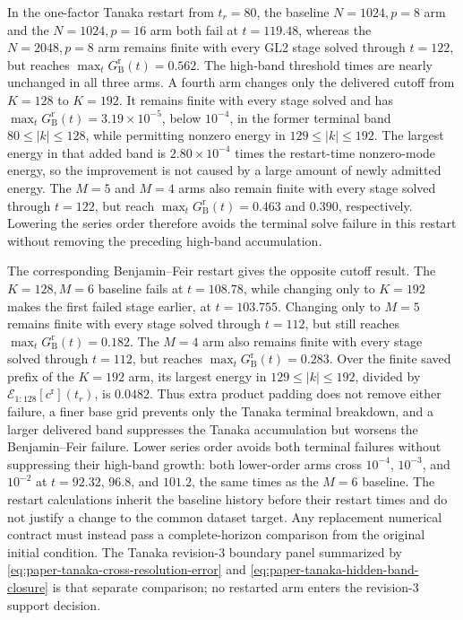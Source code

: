 In the one-factor Tanaka restart from \(t_r=80\), the
baseline \(N=1024,p=8\) arm and the \(N=1024,p=16\) arm both fail at
\(t=119.48\), whereas the \(N=2048,p=8\) arm remains finite with every GL2
stage solved through \(t=122\), but reaches
\(\max_t G_{\mathrm B}^{\mathrm r}(t)=0.562\).  The high-band threshold
times are nearly unchanged in all three arms.  A fourth arm changes only the
delivered cutoff
from \(K=128\) to \(K=192\).  It remains finite with every stage solved and
has \(\max_t G_{\mathrm B}^{\mathrm r}(t)=3.19\times10^{-5}\), below
\(10^{-4}\), in the former terminal band
\(80\leq |k|\leq128\), while permitting nonzero energy in
\(129\leq |k|\leq192\).  The largest energy in that added band is
\(2.80\times10^{-4}\) times the restart-time nonzero-mode energy, so the
improvement is not caused by a large amount of newly admitted energy.
The \(M=5\) and \(M=4\) arms also remain finite with every stage solved through
\(t=122\), but reach \(\max_t G_{\mathrm B}^{\mathrm r}(t)=0.463\) and
\(0.390\), respectively.
Lowering the series order therefore avoids the terminal solve failure in this
restart without removing the preceding high-band accumulation.

The corresponding Benjamin--Feir restart gives the opposite cutoff result.
The \(K=128,M=6\) baseline fails at \(t=108.78\), while changing only to
\(K=192\) makes the first failed stage earlier, at \(t=103.755\).  Changing
only to \(M=5\) remains finite with every stage solved through \(t=112\), but
still reaches \(\max_t G_{\mathrm B}^{\mathrm r}(t)=0.182\).  The \(M=4\)
arm also remains finite with every stage solved through \(t=112\), but reaches
\(\max_t G_{\mathrm B}^{\mathrm r}(t)=0.283\).  Over the finite saved prefix
of the \(K=192\) arm, its largest energy in \(129\leq|k|\leq192\), divided by
\(\mathcal E_{1:128}[c^{\mathrm r}](t_r)\), is \(0.0482\).  Thus extra product
padding does not remove either failure, a finer base grid prevents only the
Tanaka terminal breakdown, and a larger delivered band suppresses the Tanaka
accumulation but worsens the Benjamin--Feir failure.  Lower series order
avoids both terminal failures without suppressing their high-band growth:
both lower-order arms cross \(10^{-4}\), \(10^{-3}\), and \(10^{-2}\) at
\(t=92.32\), \(96.8\), and \(101.2\), the same times as the \(M=6\)
baseline.  The restart calculations inherit the baseline history before their
restart times and do not justify a change to the common dataset target.  Any
replacement numerical contract must instead pass a complete-horizon
comparison from the original initial condition.  The Tanaka revision-3
boundary panel summarized by \cref{eq:paper-tanaka-cross-resolution-error}
and \cref{eq:paper-tanaka-hidden-band-closure} is that separate comparison;
no restarted arm enters the revision-3 support decision.

